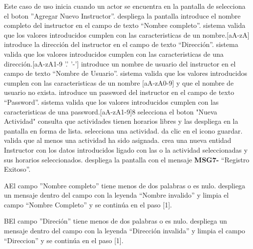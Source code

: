 \begin{UCtrayectoria}{Este caso de uso inicia cuando un actor se encuentra en la pantalla de }
	\UCpaso[\UCactor] selecciona el boton ''Agregar Nuevo Instructor''.
	\UCpaso despliega la pantalla 
	\UCpaso[\UCactor]introduce el nombre completo del instructor en el campo de texto “Nombre completo”.
	\UCpaso sistema valida que los valores introducidos cumplen con las caracteristicas de un nombre.[aA-zA]
	\UCpaso[\UCactor]introduce la dirección del instructor en el campo de texto “Dirección”.
	\UCpaso sistema valida que los valores introducidos cumplen con las caracteristicas de una dirección.[aA-zA1-9 '.' '-']
	\UCpaso[\UCactor]introduce un nombre de usuario del instructor en el campo de texto “Nombre de Usuario”.
	\UCpaso sistema valida que los valores introducidos cumplen con las caracteristicas de un nombre [aA-zA0-9] y que el nombre de usuario no exista.
	\UCpaso[\UCactor]introduce un password del instructor en el campo de texto “Password”.
	\UCpaso sistema valida que los valores introducidos cumplen con las caracteristicas de una password.[aA-zA1-9]{8}
	\UCpaso selecciona el boton "Nueva Actividad"
	\UCpaso consulta que actividades tienen horarios libres y las despliega en la pantalla en forma de lista.
	\UCpaso[\UCactor] selecciona una actividad.
	\UCpaso {}
	\UCpaso [\UCactor] da clic en el icono guardar.
	\UCpaso valida que al menos una actividad ha sido asignada.
	\UCpaso crea una nueva entidad Instructor con los datos introducidos ligado con las o la actividad seleccionadas y sus horarios seleccionados.
	\UCpaso despliega la pantalla  con el mensaje {\bf MSG7-} “Registro Exitoso”.
\end{UCtrayectoria}
\begin{UCtrayectoriaA}{A}{El campo ''Nombre completo'' tiene menos de dos palabras o es nulo.}
			\UCpaso despliega un mensaje dentro del campo con la leyenda “Nombre invalido” y limpia el campo “Nombre Completo” y se continúa en el paso [1].
\end{UCtrayectoriaA}
\begin{UCtrayectoriaA}{B}{El campo ''Direción'' tiene menos de dos palabras o es nulo.}
			\UCpaso despliega un mensaje dentro del campo con la leyenda “Dirección invalida” y limpia el campo “Direccion” y se continúa en el paso [1].
\end{UCtrayectoriaA}
